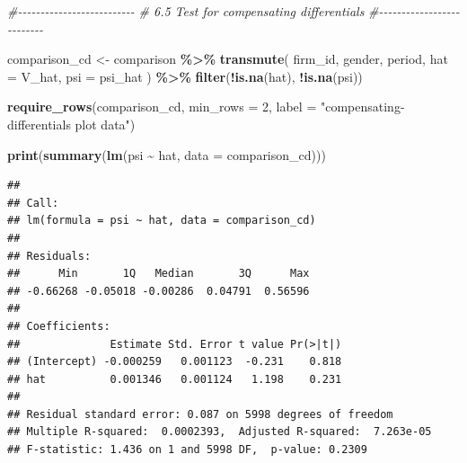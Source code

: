 \documentclass[
]{article}
\newenvironment{Shaded}{\begin{snugshade}}{\end{snugshade}}
\newcommand{\AttributeTok}[1]{\textcolor[rgb]{0.13,0.29,0.53}{#1}}
\newcommand{\CommentTok}[1]{\textcolor[rgb]{0.56,0.35,0.01}{\textit{#1}}}
\newcommand{\DecValTok}[1]{\textcolor[rgb]{0.00,0.00,0.81}{#1}}
\newcommand{\FunctionTok}[1]{\textcolor[rgb]{0.13,0.29,0.53}{\textbf{#1}}}
\newcommand{\NormalTok}[1]{#1}
\newcommand{\OtherTok}[1]{\textcolor[rgb]{0.56,0.35,0.01}{#1}}
\newcommand{\SpecialCharTok}[1]{\textcolor[rgb]{0.81,0.36,0.00}{\textbf{#1}}}
\newcommand{\StringTok}[1]{\textcolor[rgb]{0.31,0.60,0.02}{#1}}
\begin{document}
\begin{Shaded}
\begin{Highlighting}[]
\CommentTok{\#{-}{-}{-}{-}{-}{-}{-}{-}{-}{-}{-}{-}{-}{-}{-}{-}{-}{-}{-}{-}{-}{-}{-}{-}{-}{-}}
\CommentTok{\# 6.5 Test for compensating differentials}
\CommentTok{\#{-}{-}{-}{-}{-}{-}{-}{-}{-}{-}{-}{-}{-}{-}{-}{-}{-}{-}{-}{-}{-}{-}{-}{-}{-}{-}}

\NormalTok{comparison\_cd }\OtherTok{\textless{}{-}}\NormalTok{ comparison }\SpecialCharTok{\%\textgreater{}\%}
    \FunctionTok{transmute}\NormalTok{(}
\NormalTok{        firm\_id,}
\NormalTok{        gender,}
\NormalTok{        period,}
        \AttributeTok{hat =}\NormalTok{ V\_hat,}
        \AttributeTok{psi =}\NormalTok{ psi\_hat}
\NormalTok{    ) }\SpecialCharTok{\%\textgreater{}\%}
    \FunctionTok{filter}\NormalTok{(}\SpecialCharTok{!}\FunctionTok{is.na}\NormalTok{(hat), }\SpecialCharTok{!}\FunctionTok{is.na}\NormalTok{(psi))}

\FunctionTok{require\_rows}\NormalTok{(comparison\_cd, }\AttributeTok{min\_rows =} \DecValTok{2}\NormalTok{, }\AttributeTok{label =} \StringTok{"compensating{-}differentials plot data"}\NormalTok{)}

\FunctionTok{print}\NormalTok{(}\FunctionTok{summary}\NormalTok{(}\FunctionTok{lm}\NormalTok{(psi }\SpecialCharTok{\textasciitilde{}}\NormalTok{ hat, }\AttributeTok{data =}\NormalTok{ comparison\_cd)))}
\end{Highlighting}
\end{Shaded}

\begin{verbatim}
## 
## Call:
## lm(formula = psi ~ hat, data = comparison_cd)
## 
## Residuals:
##      Min       1Q   Median       3Q      Max 
## -0.66268 -0.05018 -0.00286  0.04791  0.56596 
## 
## Coefficients:
##              Estimate Std. Error t value Pr(>|t|)
## (Intercept) -0.000259   0.001123  -0.231    0.818
## hat          0.001346   0.001124   1.198    0.231
## 
## Residual standard error: 0.087 on 5998 degrees of freedom
## Multiple R-squared:  0.0002393,  Adjusted R-squared:  7.263e-05 
## F-statistic: 1.436 on 1 and 5998 DF,  p-value: 0.2309
\end{verbatim}
\end{document}
